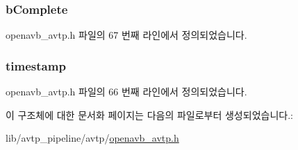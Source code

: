 \subsubsection[{\texorpdfstring{b\+Complete}{bComplete}}]{ b\+Complete}\hypertarget{structavtp__rx__info__t_aa9bc14397eb72e06780631cb2027d7ad}{}\label{structavtp__rx__info__t_aa9bc14397eb72e06780631cb2027d7ad}


openavb\+\_\+avtp.\+h 파일의 67 번째 라인에서 정의되었습니다.

\subsubsection[{\texorpdfstring{timestamp}{timestamp}}]{ timestamp}\hypertarget{structavtp__rx__info__t_a789796b7042ad0c179aca7d160c8def8}{}\label{structavtp__rx__info__t_a789796b7042ad0c179aca7d160c8def8}


openavb\+\_\+avtp.\+h 파일의 66 번째 라인에서 정의되었습니다.



이 구조체에 대한 문서화 페이지는 다음의 파일로부터 생성되었습니다.\+:\begin{DoxyCompactItemize}
\item 
lib/avtp\+\_\+pipeline/avtp/\hyperlink{openavb__avtp_8h}{openavb\+\_\+avtp.\+h}\end{DoxyCompactItemize}
